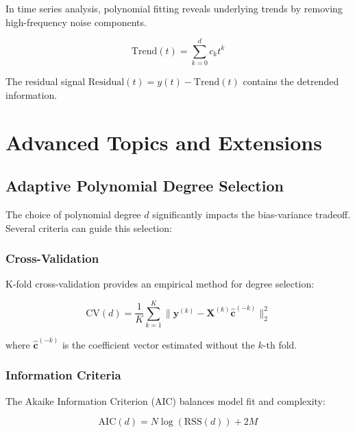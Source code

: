 \documentclass[12pt]{article}
\renewcommand{\vec}[1]{\mathbf{#1}}
\begin{document}
In time series analysis, polynomial fitting reveals underlying trends by removing high-frequency noise components.

\begin{equation}
    \text{Trend}(t) = \sum_{k=0}^d c_k t^k
\end{equation}

The residual signal $\text{Residual}(t) = y(t) - \text{Trend}(t)$ contains the detrended information.

\newpage

\section{Advanced Topics and Extensions}

\subsection{Adaptive Polynomial Degree Selection}

The choice of polynomial degree $d$ significantly impacts the bias-variance tradeoff. Several criteria can guide this selection:

\subsubsection{Cross-Validation}

K-fold cross-validation provides an empirical method for degree selection:

\begin{equation}
    \text{CV}(d) = \frac{1}{K} \sum_{k=1}^K \|\vec{y}^{(k)} - \mathbf{X}^{(k)} \hat{\vec{c}}^{(-k)}\|_2^2
\end{equation}

where $\hat{\vec{c}}^{(-k)}$ is the coefficient vector estimated without the $k$-th fold.

\subsubsection{Information Criteria}

The Akaike Information Criterion (AIC) balances model fit and complexity:

\begin{equation}
    \text{AIC}(d) = N \log(\text{RSS}(d)) + 2M
\end{equation}
\end{document}

